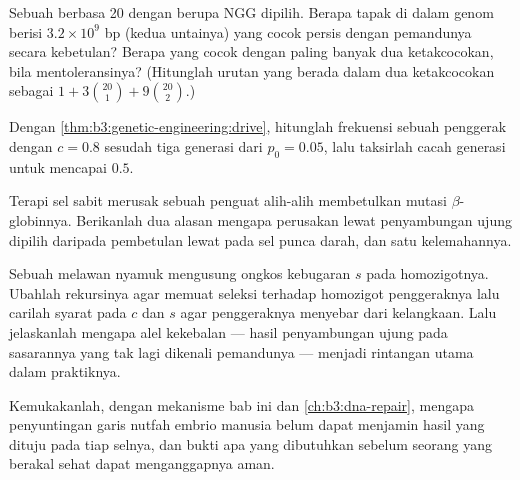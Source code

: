\begin{exercise}[$\star\star$]\label{exo:b3:genetic-engineering:8}
Sebuah  berbasa 20 dengan  berupa NGG dipilih. Berapa tapak di
dalam genom berisi $3.2\times 10^{9}$ bp (kedua untainya) yang cocok persis
dengan pemandunya secara kebetulan? Berapa yang cocok dengan paling banyak dua
ketakcocokan, bila  mentoleransinya? (Hitunglah urutan yang berada dalam
dua ketakcocokan sebagai $1 + 3\binom{20}{1} +
9\binom{20}{2}$.)
\end{exercise}

\begin{exercise}[$\star\star$]\label{exo:b3:genetic-engineering:9}
Dengan \cref{thm:b3:genetic-engineering:drive}, hitunglah frekuensi sebuah
penggerak dengan $c = 0.8$ sesudah tiga generasi dari $p_{0} = 0.05$, lalu
taksirlah cacah generasi untuk mencapai $0.5$.
\end{exercise}

\begin{exercise}[$\star\star\star$]\label{exo:b3:genetic-engineering:10}
Terapi sel sabit merusak sebuah penguat alih-alih membetulkan mutasi
$\beta$-globinnya. Berikanlah dua alasan mengapa perusakan lewat penyambungan
ujung dipilih daripada pembetulan lewat  pada sel punca
darah, dan satu kelemahannya.
\end{exercise}

\begin{exercise}[$\star\star\star$]\label{exo:b3:genetic-engineering:11}
Sebuah  melawan nyamuk mengusung ongkos kebugaran $s$ pada
homozigotnya. Ubahlah rekursinya agar memuat seleksi terhadap homozigot
penggeraknya lalu carilah syarat pada $c$ dan $s$ agar penggeraknya menyebar
dari kelangkaan. Lalu jelaskanlah mengapa alel kekebalan --- hasil penyambungan
ujung pada sasarannya yang tak lagi dikenali pemandunya --- menjadi rintangan
utama dalam praktiknya.
\end{exercise}

\begin{exercise}[$\star\star\star$]\label{exo:b3:genetic-engineering:12}
Kemukakanlah, dengan mekanisme bab ini dan
\cref{ch:b3:dna-repair}, mengapa penyuntingan garis nutfah embrio manusia
belum dapat menjamin hasil yang dituju pada tiap selnya, dan bukti apa yang
dibutuhkan sebelum seorang yang berakal sehat dapat menganggapnya aman.
\end{exercise}

